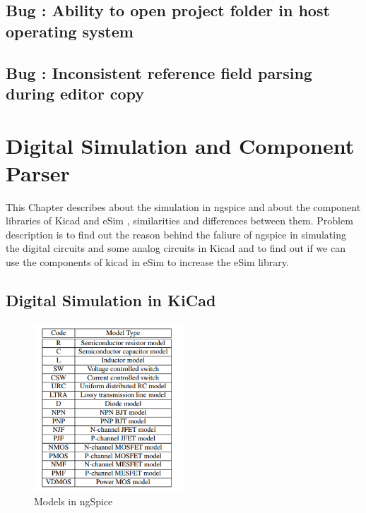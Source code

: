 \documentclass[12pt,a4paper]{report}
\begin{document}
\section{Bug : Ability to open project folder in host operating system}
\section{Bug : Inconsistent reference field parsing during editor copy}


\chapter{\textbf{Digital Simulation and Component Parser}}
This Chapter describes about the simulation in ngspice and about the component libraries of Kicad and eSim , similarities and differences between them. Problem description is to find out the reason behind the faliure of ngspice in simulating the digital circuits and some analog circuits in Kicad and to find out if we can use the components of kicad in eSim to increase the eSim library.
\section{Digital Simulation in KiCad}

\begin{figure} %
	\centering
	\includegraphics[width=0.5\textwidth]{models}
	\caption{Models in ngSpice}
\end{figure}
\end{document}
